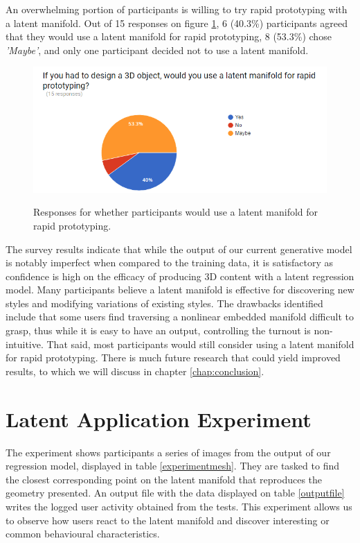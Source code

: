 \documentclass[ %
author={Dillon Keith Diep},
supervisor={Dr. Carl Henrik Ek},
degree={MEng},
title={ART-CG Hair:},
subtitle={Assisted Real-time Content Generation of Stylised Virtual Hair},
type={Research},
year={2017} ]{dissertation}
\begin{document}
An overwhelming portion of participants is willing to try rapid prototyping with a latent manifold. Out of 15 responses on figure \ref{surveyPrototype}, 6 (40.3\%) participants agreed that they would use a latent manifold for rapid prototyping, 8 (53.3\%) chose \textit{'Maybe'}, and only one participant decided not to use a latent manifold. 

\begin{figure}[!h]
	\centering
	\caption{Responses for whether participants would use a latent manifold for rapid prototyping.}
	\includegraphics[scale=0.7]{images/surveyPrototype}
	\label{surveyPrototype}
\end{figure}

The survey results indicate that while the output of our current generative model is notably imperfect when compared to the training data, it is satisfactory as confidence is high on the efficacy of producing 3D content with a latent regression model. Many participants believe a latent manifold is effective for discovering new styles and modifying variations of existing styles. The drawbacks identified include that some users find traversing a nonlinear embedded manifold difficult to grasp, thus while it is easy to have an output, controlling the turnout is non-intuitive. That said, most participants would still consider using a latent manifold for rapid prototyping. There is much future research that could yield improved results, to which we will discuss in chapter \ref{chap:conclusion}.

\section{Latent Application Experiment}
\label{evaluation:experiment}
The experiment shows participants a series of images from the output of our regression model, displayed in table \ref{experimentmesh}. They are tasked to find the closest corresponding point on the latent manifold that reproduces the geometry presented. An output file with the data displayed on table \ref{outputfile} writes the logged user activity obtained from the tests. This experiment allows us to observe how users react to the latent manifold and discover interesting or common behavioural characteristics.
\end{document}
